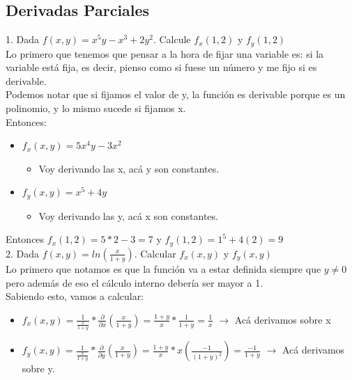 \documentclass[10pt,a4paper]{article}
\begin{document}
\subsection*{Derivadas Parciales}
\label{subsec:derivadas_parciales}
1. Dada $f(x,y) = x^{5}y - x^{3} + 2y^{2}$. Calcule $f_{x}(1, 2)$ y $f_{y}(1, 2)$ \\
Lo primero que tenemos que pensar a la hora de fijar una variable es: si la variable está fija, es decir, pienso como si fuese un número y me fijo si es derivable. \\
Podemos notar que si fijamos el valor de y, la función es derivable porque es un polinomio, y lo mismo sucede si fijamos x. \\
Entonces:
\begin{itemize}
    \item $f_{x}(x, y) = 5x^{4}y-3x^{2}$ 
    \begin{itemize}
        \item Voy derivando las x, acá y son constantes.
    \end{itemize}
    \item $f_{y}(x,y) = x^{5} + 4y $
    \begin{itemize}
        \item Voy derivando las y, acá x son constantes.
    \end{itemize}
\end{itemize}
Entonces $f_{x}(1, 2) = 5 * 2 - 3 = 7$ y $f_{y}(1, 2) = 1^{5} + 4(2) = 9$ \\
2. Dada $f(x,y) = ln(\frac{x}{1+y}).$ Calcular $f_{x}(x,y)$  y $f_{y}(x, y)$ \\
Lo primero que notamos es que la función va a estar definida siempre que $y \neq 0$ pero además de eso el cálculo interno debería ser mayor a 1. \\
Sabiendo esto, vamos a calcular: 
\begin{itemize}
    \item $f_{x}(x,y) = \frac{1}{\frac{x}{1+y}} * \frac{\partial}{\partial x}(\frac{x}{1+y}) = \frac{1+y}{x} * \frac{1}{1+y} = \frac{1}{x}$ $\rightarrow$ Acá derivamos sobre x
    \item $f_{y}(x,y) = \frac{1}{\frac{x}{1+y}} * \frac{\partial}{\partial y}(\frac{x}{1+y}) = \frac{1+y}{x} * x (\frac{-1}{(1+y)^{2}}) = \frac{-1}{1+y}$ $\rightarrow$ Acá derivamos sobre y.
\end{itemize}
\end{document}
